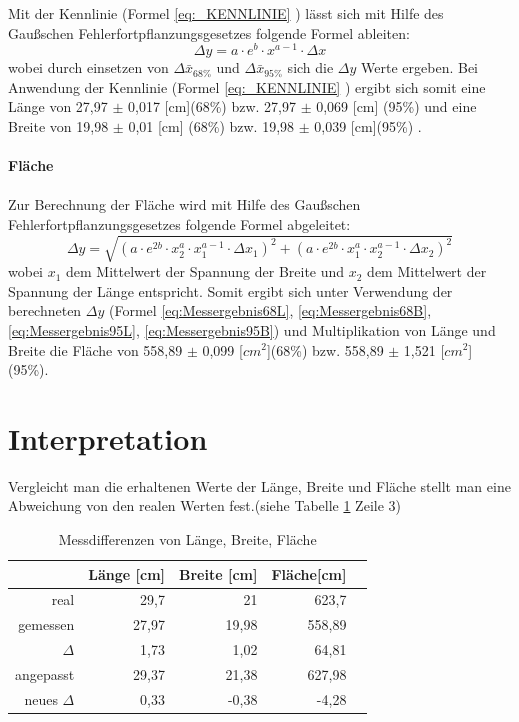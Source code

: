 \documentclass[12pt,oneside,a4paper]{report}
\begin{document}
Mit der Kennlinie (Formel \ref{eq:_KENNLINIE} ) lässt sich mit Hilfe des Gaußschen Fehlerfortpflanzungsgesetzes folgende Formel ableiten:
\begin{equation}\label{eq:GaussFehler}
\Delta y = a \cdot e^{b} \cdot x^{a-1} \cdot \Delta x
\end{equation}
wobei durch einsetzen von $ \Delta\bar{x}_{68\%} $ und $ \Delta\bar{x}_{95\%} $ sich die $\Delta y$ Werte ergeben. Bei Anwendung der Kennlinie (Formel \ref{eq:_KENNLINIE} ) ergibt sich somit eine Länge von 27,97 $\pm$ 0,017 [cm](68\%) bzw. 27,97 $\pm$ 0,069 [cm] (95\%) und eine Breite von 19,98 $\pm$ 0,01 [cm] (68\%) bzw. 19,98 $\pm$ 0,039 [cm](95\%) .

\paragraph{}\textbf{Fläche}
\paragraph{}Zur Berechnung der Fläche wird mit Hilfe des Gaußschen Fehlerfortpflanzungsgesetzes folgende Formel abgeleitet:
\begin{equation}\label{eq:GaussFehler2}
\Delta y =\sqrt{\left(  a \cdot e^{2b} \cdot x_{2}^{a} \cdot x_{1}^{a-1} \cdot \Delta x_{1}\right)^2 + \left(  a \cdot e^{2b} \cdot x_{1}^{a} \cdot x_{2}^{a-1} \cdot \Delta x_{2}\right)^2}
\end{equation}
wobei $x_{1}$ dem Mittelwert der Spannung der Breite und  $x_{2}$ dem Mittelwert der Spannung der Länge entspricht. Somit ergibt sich unter Verwendung der berechneten $\Delta y$ (Formel \ref{eq:Messergebnis68L},
\ref{eq:Messergebnis68B}, \ref{eq:Messergebnis95L}, \ref{eq:Messergebnis95B}) und Multiplikation von Länge und Breite die  Fläche von 558,89 $\pm$ 0,099 [$cm^{2}$](68\%) bzw. 558,89 $\pm$ 1,521 [$cm^{2}$] (95\%).

\section{Interpretation}
\label{chap:VERSUCH_3_INTERPRETATION}
Vergleicht man die erhaltenen Werte der Länge, Breite und Fläche stellt man eine Abweichung von den realen Werten fest.(siehe Tabelle \ref{tab:Aufg3Tabelle2} Zeile 3)

\begin{table}[H]
\begin{tabular}{|r||r|r|r|r|}
\hline 
  & Länge [cm] &  Breite [cm] & Fläche[cm] \\ 
\hline 
 real & 29,7 & 21 & 623,7 \\ 
\hline 
 gemessen & 27,97 & 19,98 & 558,89 \\ 
\hline
$\Delta$ & 1,73 & 1,02 & 64,81 \\ 
\hline 
 angepasst & 29,37 & 21,38 & 627,98 \\ 
\hline
neues $\Delta$ & 0,33 & -0,38 & -4,28 \\ 
\hline 
\end{tabular} 
\caption{Messdifferenzen von Länge, Breite, Fläche}
\label{tab:Aufg3Tabelle2}
\end{table}
\end{document}
